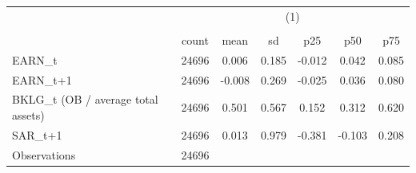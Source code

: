 {
\def\sym#1{\ifmmode^{#1}\else\(^{#1}\)\fi}
\begin{tabular}{l*{1}{cccccc}}
\hline\hline
                    &\multicolumn{6}{c}{(1)}                                                      \\
                    &\multicolumn{6}{c}{}                                                         \\
                    &       count&        mean&          sd&         p25&         p50&         p75\\
\hline
EARN\_t              &       24696&       0.006&       0.185&      -0.012&       0.042&       0.085\\
EARN\_t+1            &       24696&      -0.008&       0.269&      -0.025&       0.036&       0.080\\
BKLG\_t (OB / average total assets)&       24696&       0.501&       0.567&       0.152&       0.312&       0.620\\
SAR\_t+1             &       24696&       0.013&       0.979&      -0.381&      -0.103&       0.208\\
\hline
Observations        &       24696&            &            &            &            &            \\
\hline\hline
\end{tabular}
}
